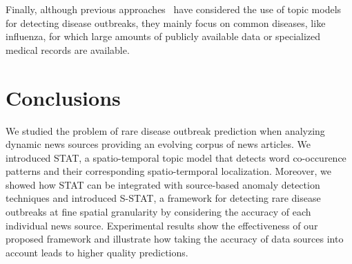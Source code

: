 \documentclass[conference]{IEEEtran}
\newcommand{\model}{{STAT}\xspace} %
\newcommand{\fullmodel}{{S-STAT}\xspace}
\begin{document}
Finally, although previous approaches~\cite{paul:11, sadilek:2012, rider:2013} have considered the use of topic models for detecting disease outbreaks, they mainly focus on common diseases, like influenza, for which large amounts of publicly available data or specialized medical records are available. 

\section{Conclusions}
\label{sec:conclusion}
We studied the problem of rare disease outbreak prediction when analyzing dynamic news sources providing an evolving corpus of news articles. We introduced \model, a spatio-temporal topic model that  detects word co-occurence patterns and their corresponding spatio-termporal localization. Moreover, we showed how \model can be integrated with source-based anomaly detection techniques and introduced \fullmodel, a framework for detecting rare disease outbreaks at fine spatial granularity by considering the accuracy of each individual news source. Experimental results show the effectiveness of our proposed framework and illustrate how taking the accuracy of data sources into account leads to higher quality predictions.




\appendix
\end{document}
